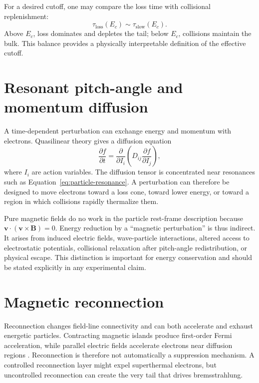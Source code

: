 For a desired cutoff, one may compare the loss time with collisional replenishment:
\begin{equation}
\tau_{\mathrm{loss}}(E_c)\sim\tau_{\mathrm{slow}}(E_c).
\label{eq:cutoff-balance}
\end{equation}
Above $E_c$, loss dominates and depletes the tail; below $E_c$, collisions maintain the bulk. This balance provides a physically interpretable definition of the effective cutoff.

\section{Resonant pitch-angle and momentum diffusion}

A time-dependent perturbation can exchange energy and momentum with electrons. Quasilinear theory gives a diffusion equation
\begin{equation}
\frac{\partial f}{\partial t}
=\frac{\partial}{\partial I_i}
\left(D_{ij}\frac{\partial f}{\partial I_j}\right),
\label{eq:ql}
\end{equation}
where $I_i$ are action variables. The diffusion tensor is concentrated near resonances such as Equation~\eqref{eq:particle-resonance}. A perturbation can therefore be designed to move electrons toward a loss cone, toward lower energy, or toward a region in which collisions rapidly thermalize them.

Pure magnetic fields do no work in the particle rest-frame description because $\mathbf{v}\cdot(\mathbf{v}\times\mathbf{B})=0$. Energy reduction by a ``magnetic perturbation'' is thus indirect. It arises from induced electric fields, wave-particle interactions, altered access to electrostatic potentials, collisional relaxation after pitch-angle redistribution, or physical escape. This distinction is important for energy conservation and should be stated explicitly in any experimental claim.

\section{Magnetic reconnection}

Reconnection changes field-line connectivity and can both accelerate and exhaust energetic particles. Contracting magnetic islands produce first-order Fermi acceleration, while parallel electric fields accelerate electrons near diffusion regions \cite{drake2006}. Reconnection is therefore not automatically a suppression mechanism. A controlled reconnection layer might expel superthermal electrons, but uncontrolled reconnection can create the very tail that drives bremsstrahlung.

